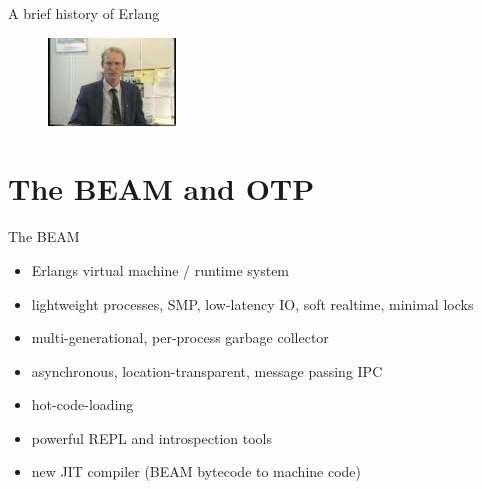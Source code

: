 \documentclass[
  ignorenonframetext,
  aspectratio=169]{beamer}
\providecommand{\tightlist}{%
  \setlength{\itemsep}{0pt}\setlength{\parskip}{0pt}}
\begin{document}
\begin{frame}{A brief history of Erlang}
\begin{figure}
\begin{minipage}{.24\textwidth}
\end{minipage}
\begin{minipage}{.24\textwidth}
  \centering
  \includegraphics[width=.9\linewidth]{./img/bjarne.jpg}
\end{minipage}
\end{figure}
\end{frame}

\section{The BEAM and OTP}\label{the-beam-and-otp}

\begin{frame}{The BEAM}
\label{the-beam}
\begin{itemize}
\tightlist
\item
  Erlang\textquotesingle s virtual machine / runtime system
\item
  lightweight processes, SMP, low-latency IO, soft realtime, minimal
  locks
\item
  multi-generational, per-process garbage collector
\item
  asynchronous, location-transparent, message passing IPC
\item
  hot-code-loading
\item
  powerful REPL and introspection tools
\item
  new JIT compiler (BEAM bytecode to machine code)
\end{itemize}
\end{frame}
\end{document}

